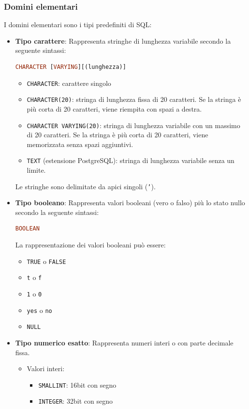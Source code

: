 \documentclass[a4paper,twoside]{article}
\begin{document}
\subsubsection{Domini elementari}
I domini elementari sono i tipi predefiniti di SQL:
\begin{itemize}
  \item \textbf{Tipo carattere}:
    Rappresenta stringhe di lunghezza variabile secondo la seguente sintassi:
\begin{lstlisting}[language=SQL, numbers=none]
CHARACTER [VARYING][(lunghezza)]
\end{lstlisting}
    \begin{itemize}
      \item \texttt{CHARACTER}: carattere singolo

      \item \texttt{CHARACTER(20)}: stringa di lunghezza fissa di 20 caratteri.
        Se la stringa è più corta di 20 caratteri, viene riempita con spazi a destra.

      \item \texttt{CHARACTER VARYING(20)}: stringa di lunghezza variabile con un massimo
        di 20 caratteri. Se la stringa è più corta di 20 caratteri, viene memorizzata
        senza spazi aggiuntivi.

      \item \texttt{TEXT} (estensione PostgreSQL): stringa di lunghezza variabile senza
        un limite.
    \end{itemize}
    Le stringhe sono delimitate da apici singoli (\texttt{'}).

  \item \textbf{Tipo booleano}:
    Rappresenta valori booleani (vero o falso) più lo stato nullo secondo la seguente
    sintassi:
\begin{lstlisting}[language=SQL, numbers=none]
BOOLEAN
\end{lstlisting}
    La rappresentazione dei valori booleani può essere:
    \begin{itemize}
      \item \texttt{TRUE} o \texttt{FALSE}
      \item \texttt{t} o \texttt{f}
      \item \texttt{1} o \texttt{0}
      \item \texttt{yes} o \texttt{no}
      \item \texttt{NULL}
    \end{itemize}

  \item \textbf{Tipo numerico esatto}:
    Rappresenta numeri interi o con parte decimale fissa.
    \begin{itemize}
      \item Valori interi:
        \begin{itemize}
          \item \texttt{SMALLINT}: 16bit con segno
          \item \texttt{INTEGER}: 32bit con segno
        \end{itemize}


\end{itemize}
\end{itemize}
\end{document}
